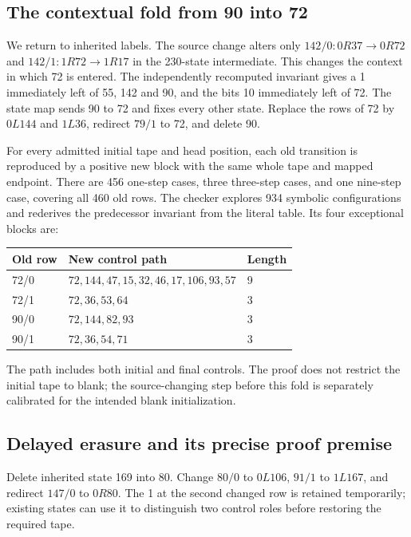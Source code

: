 \documentclass[11pt,a4paper]{article}
\begin{document}
\subsection{The contextual fold from 90 into 72}

We return to inherited labels. The source change alters only
$142/0:0R37\to0R72$ and $142/1:1R72\to1R17$ in the 230-state
intermediate. This changes the context in which 72 is entered.
The independently recomputed invariant gives a 1 immediately left of
55, 142 and 90, and the bits 10 immediately left of 72.
The state map sends 90 to 72 and fixes every other state. Replace the
rows of 72 by $0L144$ and $1L36$, redirect $79/1$ to 72, and delete 90.

For every admitted initial tape and head position, each old transition
is reproduced by a positive new block with the same whole tape and
mapped endpoint. There are 456 one-step cases, three three-step cases,
and one nine-step case, covering all 460 old rows. The checker explores
934 symbolic configurations and rederives the predecessor invariant
from the literal table. Its four exceptional blocks are:
\begin{center}\small
\begin{tabular}{lll}
\toprule
Old row & New control path & Length\\
\midrule
72/0 & $72,144,47,15,32,46,17,106,93,57$ & 9\\
72/1 & $72,36,53,64$ & 3\\
90/0 & $72,144,82,93$ & 3\\
90/1 & $72,36,54,71$ & 3\\
\bottomrule
\end{tabular}
\end{center}
The path includes both initial and final controls. The proof does not
restrict the initial tape to blank; the source-changing step before
this fold is separately calibrated for the intended blank initialization.

\subsection{Delayed erasure and its precise proof premise}

Delete inherited state 169 into 80. Change $80/0$ to $0L106$,
$91/1$ to $1L167$, and redirect $147/0$ to $0R80$. The 1 at the
second changed row is retained temporarily; existing states can use it
to distinguish two control roles before restoring the required tape.
\end{document}
